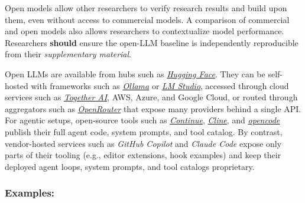 \documentclass[smallextended]{svjour3}
\newcommand{\should}{\textbf{should}\xspace}
\newcommand{\supplementarymaterial}{\emph{supplementary material}\xspace}
\newcommand{\supplementarymaterial}{\emph{supplementary material}\xspace}
\newcommand{\guidelinesubsubsection}[1]{\subsubsection{\bfseries #1:}}
\newcommand{\guidelinesubsubsection}[1]{\subsubsection{#1}}
\begin{document}
Open models allow other researchers to verify research results and build upon them, even without access to commercial models.
A comparison of commercial and open models also allows researchers to contextualize model performance.
Researchers \should ensure the open-LLM baseline is independently reproducible from their \supplementarymaterial.

Open LLMs are available from hubs such as \href{https://huggingface.co/}{\emph{Hugging Face}}. They can be self-hosted with frameworks such as \href{https://ollama.com/}{\emph{Ollama}} or \href{https://lmstudio.ai/}{\emph{LM Studio}}, accessed through cloud services such as \href{https://together.ai/}{\emph{Together AI}}, AWS, Azure, and Google Cloud, or routed through aggregators such as \href{https://openrouter.ai/}{\emph{OpenRouter}} that expose many providers behind a single API. For agentic setups, open-source tools such as \href{https://www.continue.dev/}{\emph{Continue}}, \href{https://cline.bot/}{\emph{Cline}}, and \href{https://opencode.ai/}{\emph{opencode}}~\cite{opencode} publish their full agent code, system prompts, and tool catalog. By contrast, vendor-hosted services such as \emph{GitHub Copilot} and \emph{Claude Code} expose only parts of their tooling (e.g., editor extensions, hook examples) and keep their deployed agent loops, system prompts, and tool catalogs proprietary.

\guidelinesubsubsection{Examples}
\end{document}
